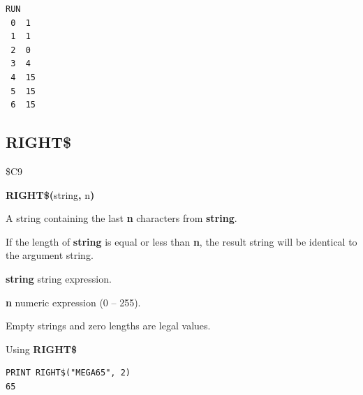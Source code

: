\begin{description}[leftmargin=2cm,style=nextline]
\begin{tcolorbox}[colback=black,coltext=white]
\begin{verbatim}
RUN
 0  1
 1  1
 2  0
 3  4
 4  15
 5  15
 6  15
\end{verbatim}
\end{tcolorbox}
\end{description}


\newpage
\subsection{RIGHT\$}
\begin{description}[leftmargin=2cm,style=nextline]
\item [Token:]    \$C9

\item [Format:]   {\bf RIGHT\$(}string{\bf,} n{\bf)}

\item [Returns:]  A string containing the last {\bf n} characters from {\bf string}.

                  If the length of {\bf string} is equal or less than {\bf n}, the result string will be identical to the argument string.

                  {\bf string} string expression.

                  {\bf n} numeric expression (0 -- 255).

\item [Remarks:]  Empty strings and zero lengths are legal values.

\item [Example:]  Using {\bf RIGHT\$}

\begin{tcolorbox}[colback=black,coltext=white]
\verbatimfont{\codefont}
\begin{verbatim}
PRINT RIGHT$("MEGA65", 2)
65
\end{verbatim}
\end{tcolorbox}
\end{description}


\newpage
